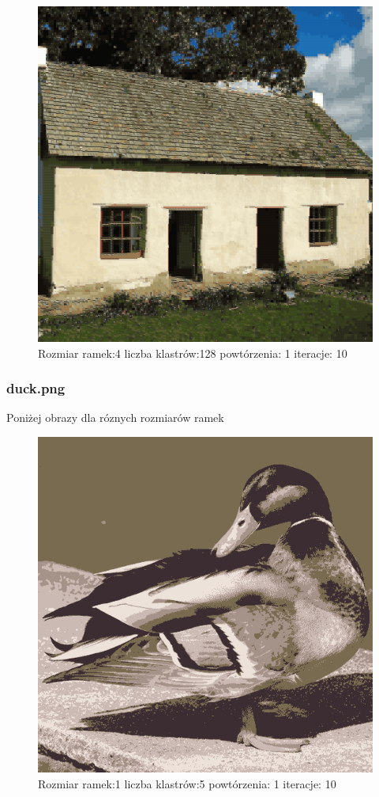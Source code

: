 \documentclass{classrep}
\begin{document}
{{{{                    \begin{figure}[!htbp]
                        \centering
                        \includegraphics[width=\textwidth,width=90mm]{obrazy/house_R4_K128_P1_It10.png}
                        \caption{Rozmiar ramek:4 liczba klastrów:128 powtórzenia: 1 iteracje: 10 }
                    \end{figure}
                    \FloatBarrier
                }

                \subsubsection{duck.png}
                {
                    Poniżej obrazy dla róznych rozmiarów ramek
                    \begin{figure}[!htbp]
                        \centering
                        \includegraphics[width=\textwidth,width=90mm]{obrazy/duck_R1_K5_P1_It10.png}
                        \caption{Rozmiar ramek:1 liczba klastrów:5 powtórzenia: 1 iteracje: 10 }
                    \end{figure}

}}}}
\end{document}
